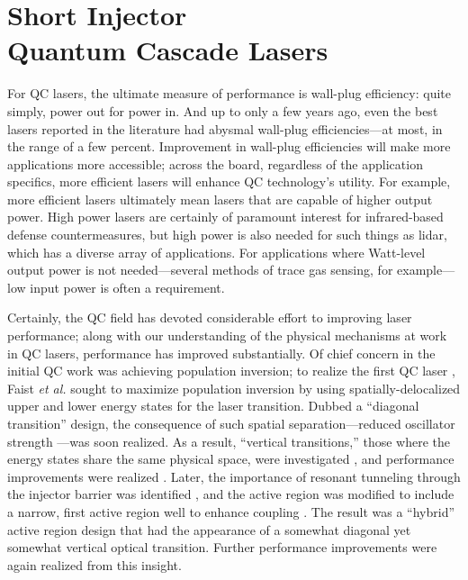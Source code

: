%
%

\chapter[Short Injector Quantum Cascade Lasers]{Short Injector \\ Quantum Cascade Lasers}

For QC lasers, the ultimate measure of performance is wall-plug efficiency: quite simply, power out for power in.  And up to only a few years ago, even the best lasers reported in the literature had abysmal wall-plug efficiencies---at most, in the range of a few percent.  Improvement in wall-plug efficiencies will make more applications more accessible; across the board, regardless of the application specifics, more efficient lasers will enhance QC technology's utility.  For example, more efficient lasers ultimately mean lasers that are capable of higher output power.  High power lasers are certainly of paramount interest for infrared-based defense countermeasures, but high power is also needed for such things as lidar, which has a diverse array of applications.  For applications where Watt-level output power is not needed---several methods of trace gas sensing, for example---low input power is often a requirement.

Certainly, the QC field has devoted considerable effort to improving laser performance; along with our understanding of the physical mechanisms at work in QC lasers, performance has improved substantially.  Of chief concern in the initial QC work was achieving population inversion; to realize the first QC laser \cite{Faist:Science:1994}, Faist \emph{et al.} sought to maximize population inversion by using spatially-delocalized upper and lower energy states for the laser transition.  Dubbed a ``diagonal transition'' design, the consequence of such spatial separation---reduced oscillator strength \cite{Faist:Nature:1997:oscillator}---was soon realized.  As a result, ``vertical transitions,'' those where the energy states share the same physical space, were investigated \cite{Faist:APL:1995:vertical}, and performance improvements were realized \cite{Sirtori:APL:1996:vertical}.  Later, the importance of resonant tunneling through the injector barrier was identified \cite{Sirtori:JQE:1998}, and the active region was modified to include a narrow, first active region well to enhance coupling \cite{Faist:APL:1996:coupling}.  The result was a ``hybrid'' active region design that had the appearance of a somewhat diagonal yet somewhat vertical optical transition.  Further performance improvements were again realized \cite{Gmachl:APL:1998:magic} from this insight.

